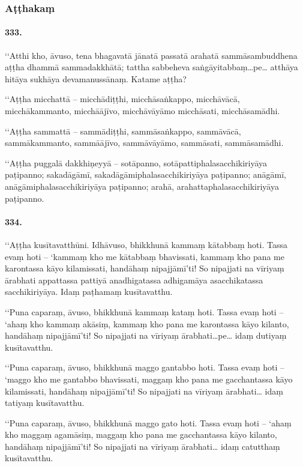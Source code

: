 \subsubsection{Aṭṭhakaṃ}

\paragraph{333.} ‘‘Atthi kho, āvuso, tena bhagavatā jānatā passatā arahatā sammāsambuddhena aṭṭha dhammā sammadakkhātā; tattha sabbeheva saṅgāyitabbaṃ…pe… atthāya hitāya sukhāya devamanussānaṃ. Katame aṭṭha?

‘‘Aṭṭha micchattā – micchādiṭṭhi, micchāsaṅkappo, micchāvācā, micchākammanto, micchāājīvo, micchāvāyāmo micchāsati, micchāsamādhi.

‘‘Aṭṭha sammattā – sammādiṭṭhi, sammāsaṅkappo, sammāvācā, sammākammanto, sammāājīvo, sammāvāyāmo, sammāsati, sammāsamādhi.

‘‘Aṭṭha puggalā dakkhiṇeyyā – sotāpanno, sotāpattiphalasacchikiriyāya paṭipanno; sakadāgāmī, sakadāgāmiphalasacchikiriyāya paṭipanno; anāgāmī, anāgāmiphalasacchikiriyāya paṭipanno; arahā, arahattaphalasacchikiriyāya paṭipanno.

\paragraph{334.} ‘‘Aṭṭha kusītavatthūni. Idhāvuso, bhikkhunā kammaṃ kātabbaṃ hoti. Tassa evaṃ hoti – ‘kammaṃ kho me kātabbaṃ bhavissati, kammaṃ kho pana me karontassa kāyo kilamissati, handāhaṃ nipajjāmī’ti! So nipajjati na vīriyaṃ ārabhati appattassa pattiyā anadhigatassa adhigamāya asacchikatassa sacchikiriyāya. Idaṃ paṭhamaṃ kusītavatthu.

‘‘Puna caparaṃ, āvuso, bhikkhunā kammaṃ kataṃ hoti. Tassa evaṃ hoti – ‘ahaṃ kho kammaṃ akāsiṃ, kammaṃ kho pana me karontassa kāyo kilanto, handāhaṃ nipajjāmī’ti! So nipajjati na vīriyaṃ ārabhati…pe… idaṃ dutiyaṃ kusītavatthu.

‘‘Puna caparaṃ, āvuso, bhikkhunā maggo gantabbo hoti. Tassa evaṃ hoti – ‘maggo kho me gantabbo bhavissati, maggaṃ kho pana me gacchantassa kāyo kilamissati, handāhaṃ nipajjāmī’ti! So nipajjati na vīriyaṃ ārabhati… idaṃ tatiyaṃ kusītavatthu.

‘‘Puna caparaṃ, āvuso, bhikkhunā maggo gato hoti. Tassa evaṃ hoti – ‘ahaṃ kho maggaṃ agamāsiṃ, maggaṃ kho pana me gacchantassa kāyo kilanto, handāhaṃ nipajjāmī’ti! So nipajjati na vīriyaṃ ārabhati… idaṃ catutthaṃ kusītavatthu.

